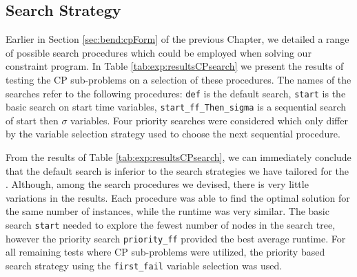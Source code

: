 

\subsection{Search Strategy}
\label{sec:exp:cpSearch}
Earlier in Section \ref{sec:bend:cpForm}
of the previous Chapter, we detailed a range of possible search procedures
which could be employed when solving our constraint program.
In Table \ref{tab:exp:resultsCPsearch} we present the results
of testing the CP sub-problems on a selection of these procedures.
The names of the searches refer to the following procedures:
{\tt def} is the default search, {\tt start} is the basic search on start time variables,
{\tt start\_ff\_Then\_sigma} is a sequential search of start then $\sigma$ variables. 
Four priority searches were considered which only differ by the variable selection
strategy used to choose the next sequential procedure.

From the results of Table \ref{tab:exp:resultsCPsearch}, 
we can immediately conclude that the default search
is inferior to the search strategies we have tailored for
the .
Although, among the search procedures we devised, there
is very little variations in the results.
Each procedure was able to find the optimal solution
for the same number of instances,
while the runtime was very similar.
The basic search {\tt start} needed to explore the fewest
number of nodes in the search tree, however the priority search
{\tt priority\_ff} provided the best average runtime.
For all remaining tests where CP sub-problems
were utilized, the priority based search strategy using 
the {\tt first\_fail} variable selection was used.


